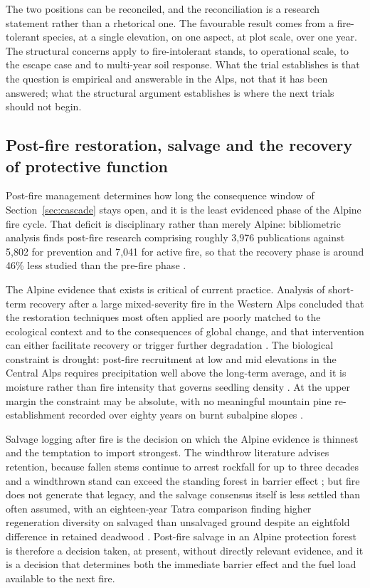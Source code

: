 \documentclass[11pt,a4paper]{article}
\begin{document}
The two positions can be reconciled, and the reconciliation is a research statement rather than a rhetorical one. The favourable result comes from a fire-tolerant species, at a single elevation, on one aspect, at plot scale, over one year. The structural concerns apply to fire-intolerant stands, to operational scale, to the escape case and to multi-year soil response. What the trial establishes is that the question is empirical and answerable in the Alps, not that it has been answered; what the structural argument establishes is where the next trials should not begin.

\subsection{Post-fire restoration, salvage and the recovery of protective function}

Post-fire management determines how long the consequence window of Section~\ref{sec:cascade} stays open, and it is the least evidenced phase of the Alpine fire cycle. That deficit is disciplinary rather than merely Alpine: bibliometric analysis finds post-fire research comprising roughly 3{,}976 publications against 5{,}802 for prevention and 7{,}041 for active fire, so that the recovery phase is around 46\% less studied than the pre-fire phase \citep{goncalves_fostering_2025}.

The Alpine evidence that exists is critical of current practice. Analysis of short-term recovery after a large mixed-severity fire in the Western Alps concluded that the restoration techniques most often applied are poorly matched to the ecological context and to the consequences of global change, and that intervention can either facilitate recovery or trigger further degradation \citep{mantero_short-term_2023}. The biological constraint is drought: post-fire recruitment at low and mid elevations in the Central Alps requires precipitation well above the long-term average, and it is moisture rather than fire intensity that governs seedling density \citep{moser_potential_2010}. At the upper margin the constraint may be absolute, with no meaningful mountain pine re-establishment recorded over eighty years on burnt subalpine slopes \citep{degiuli_arrested_2024}.

Salvage logging after fire is the decision on which the Alpine evidence is thinnest and the temptation to import strongest. The windthrow literature advises retention, because fallen stems continue to arrest rockfall for up to three decades and a windthrown stand can exceed the standing forest in barrier effect \citep{costa_biological_2021}; but fire does not generate that legacy, and the salvage consensus itself is less settled than often assumed, with an eighteen-year Tatra comparison finding higher regeneration diversity on salvaged than unsalvaged ground despite an eightfold difference in retained deadwood \citep{seben_impact_2024}. Post-fire salvage in an Alpine protection forest is therefore a decision taken, at present, without directly relevant evidence, and it is a decision that determines both the immediate barrier effect and the fuel load available to the next fire.
\end{document}
